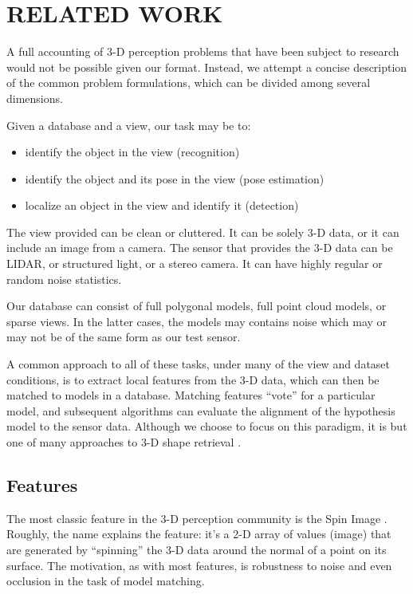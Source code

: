 \section{RELATED WORK}

A full accounting of 3-D perception problems that have been subject to research would not be possible given our format.
Instead, we attempt a concise description of the common problem formulations, which can be divided among several dimensions.

Given a database and a view, our task may be to:
\begin{itemize}
\item identify the object in the view (recognition)
\item identify the object and its pose in the view (pose estimation)
\item localize an object in the view and identify it (detection)
\end{itemize}

The view provided can be clean or cluttered.
It can be solely 3-D data, or it can include an image from a camera.
The sensor that provides the 3-D data can be LIDAR, or structured light, or a stereo camera.
It can have highly regular or random noise statistics.

Our database can consist of full polygonal models, full point cloud models, or sparse views.
In the latter cases, the models may contains noise which may or may not be of the same form as our test sensor.

A common approach to all of these tasks, under many of the view and dataset conditions, is to extract local features from the 3-D data, which can then be matched to models in a database.
Matching features ``vote'' for a particular model, and subsequent algorithms can evaluate the alignment of the hypothesis model to the sensor data.
Although we choose to focus on this paradigm, it is but one of many approaches to 3-D shape retrieval \cite{Tangelder2004}.

\subsection{Features}
The most classic feature in the 3-D perception community is the Spin Image \cite{Johnson1999}.
Roughly, the name explains the feature: it's a 2-D array of values (image) that are generated by ``spinning'' the 3-D data around the normal of a point on its surface.
The motivation, as with most features, is robustness to noise and even occlusion in the task of model matching.

